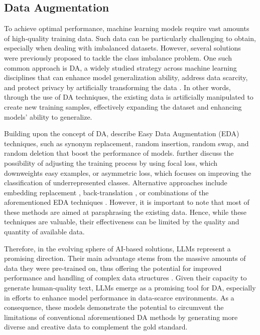 \documentclass[manuscript]{clv3}
\begin{document}
\subsection{Data Augmentation}
To achieve optimal performance, machine learning models require vast amounts of high-quality training data. Such data can be particularly challenging to obtain, especially when dealing with imbalanced datasets. However, several solutions were previously proposed to tackle the class imbalance problem. One such common approach is DA, a widely studied strategy across machine learning disciplines that can enhance model generalization ability, address data scarcity, and protect privacy by artificially transforming the data \citet{10.1145/3544558}. In other words, through the use of DA techniques, the existing data is artificially manipulated to create new training samples, effectively expanding the dataset and enhancing models' ability to generalize. 

Building upon the concept of DA, \citet{wei2019eda} describe Easy Data Augmentation (EDA) techniques, such as synonym replacement, random insertion, random swap, and random deletion that boost the performance of models. \citet{benbaruch2021asymmetriclossmultilabelclassification} further discuss the possibility of adjusting the training process by using focal loss, which downweights easy examples, or asymmetric loss, which focuses on improving the classification of underrepresented classes. Alternative approaches include embedding replacement \cite{10.1145/3357384.3358040}, back-translation \cite{xie2020unsuperviseddataaugmentationconsistency}, or combinations of the aforementioned EDA techniques \cite{DBLP:journals/corr/abs-2003-02245}. However, it is important to note that most of these methods are aimed at paraphrasing the existing data. Hence, while these techniques are valuable, their effectiveness can be limited by the quality and quantity of available data. 

Therefore, in the evolving sphere of AI-based solutions, LLMs represent a promising direction. Their main advantage stems from the massive amounts of data they were pre-trained on, thus offering the potential for improved performance and handling of complex data structures \cite{møller2023prompt}. Given their capacity to generate human-quality text, LLMs emerge as a promising tool for DA, especially in efforts to enhance model performance in data-scarce environments. As a consequence, these models demonstrate the potential to circumvent the limitations of conventional aforementioned DA methods by generating more diverse and creative data to complement the gold standard. 
\end{document}
